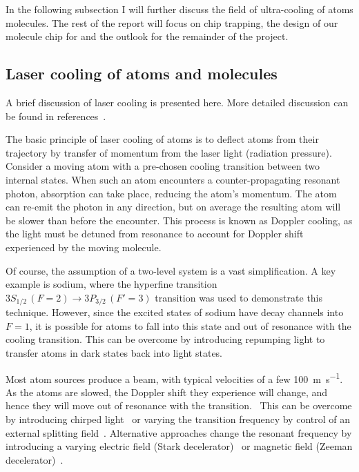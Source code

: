In the following subsection I will further discuss the field of ultra-cooling of
atoms molecules. The rest of the report will focus on chip trapping, the design
of our molecule chip for \CaF{} and the outlook for the remainder of the
project.

\subsection{Laser cooling of atoms and molecules}
\label{intro:lasercool}

A brief discussion of laser cooling is presented here. More detailed discussion
can be found in references~\cite{Metcalf1999,RevModPhys.70.721,McCarron_2018}.

The basic principle of laser cooling of atoms is to deflect atoms from their
trajectory by transfer of momentum from the laser light (radiation
pressure).~\cite{RevModPhys.70.721} Consider a moving atom with a
pre-chosen cooling transition between two internal states.  When such an atom
encounters a counter-propagating resonant photon, absorption can take place,
reducing the atom's momentum. The atom can re-emit the photon in any direction,
but on average the resulting atom will be slower than before the encounter.
This process is known as Doppler cooling, as the light must be detuned from
resonance to account for Doppler shift experienced by the moving
molecule.~\cite{Metcalf1999}

Of course, the assumption of a two-level system is a vast simplification.  A key
example is sodium, where the hyperfine transition $3S_{1/2}\, (F=2) \rightarrow
3P_{3/2}\, (F'=3)$ transition was used to demonstrate this technique. However,
since the excited states of sodium have decay channels into $F=1$, it is
possible for atoms to fall into this state and out of resonance with the
cooling transition.  This can be overcome by introducing repumping light to
transfer atoms in dark states back into light states.~\cite{RevModPhys.70.721}

Most atom sources produce a beam, with typical velocities of a few
\SI{100}{\metre\per\second}.~\cite{Metcalf1999,}  As the atoms are slowed, the
Doppler shift they experience will change, and hence they will move out of
resonance with the transition.~\cite{RevModPhys.70.721} This can be overcome by
introducing chirped light~\cite{Prodan1984} or varying the transition frequency
by control of an external splitting field~\cite{PhysRevLett.48.596}. Alternative
approaches change the resonant frequency by introducing a varying electric field
(Stark decelerator)~\cite{Bethlem1999} or magnetic field (Zeeman
decelerator)~\cite{PhysRevLett.48.596}.

